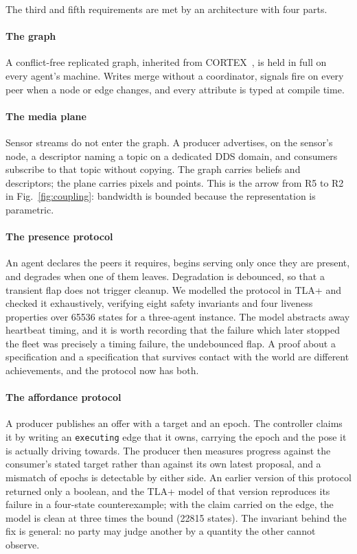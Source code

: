 \documentclass[10pt,twocolumn]{IEEEtran}
\begin{document}
The third and fifth requirements are met by an architecture with four parts.

\paragraph{The graph} A conflict-free replicated graph, inherited from
CORTEX~\cite{bustos_cortex_2019,proposal-latency-bustos}, is held in full on every agent's machine.
Writes merge without a coordinator, signals fire on every peer when a node or edge changes, and every
attribute is typed at compile time.

\paragraph{The media plane} Sensor streams do not enter the graph. A producer advertises, on the
sensor's node, a descriptor naming a topic on a dedicated DDS domain, and consumers subscribe to that
topic without copying. The graph carries beliefs and descriptors; the plane carries pixels and
points. This is the arrow from R5 to R2 in Fig.~\ref{fig:coupling}: bandwidth is bounded because the
representation is parametric.

\paragraph{The presence protocol} An agent declares the peers it requires, begins serving only once
they are present, and degrades when one of them leaves. Degradation is debounced, so that a transient
flap does not trigger cleanup. We modelled the protocol in TLA+ and checked it exhaustively, verifying
eight safety invariants and four liveness properties over \num{65536} states for a three-agent
instance. The model abstracts away heartbeat timing, and it is worth recording that the failure which
later stopped the fleet was precisely a timing failure, the undebounced flap. A proof about a
specification and a specification that survives contact with the world are different achievements,
and the protocol now has both.

\paragraph{The affordance protocol} A producer publishes an offer with a target and an epoch. The
controller claims it by writing an \texttt{executing} edge that it owns, carrying the epoch and the
pose it is actually driving towards. The producer then measures progress against the consumer's
stated target rather than against its own latest proposal, and a mismatch of epochs is detectable by
either side. An earlier version of this protocol returned only a boolean, and the TLA+ model of that
version reproduces its failure in a four-state counterexample; with the claim carried on the edge, the
model is clean at three times the bound (\num{22815} states). The invariant behind the fix is general:
no party may judge another by a quantity the other cannot observe.
\end{document}
